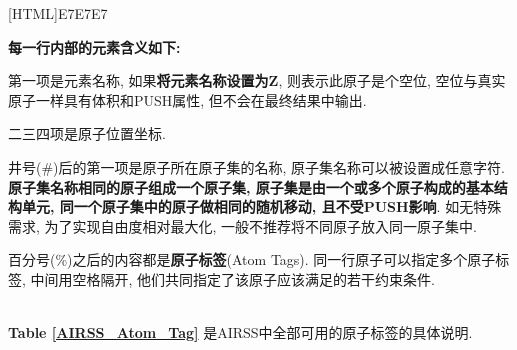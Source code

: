 \documentclass[a4paper, 10pt]{article}
\begin{document}
\noindent{}[HTML]{E7E7E7}{\parbox{\textwidth}{%
\noindent \textbf{每一行内部的元素含义如下: }
\begin{maineu}
  \item 第一项是元素名称, 如果\textbf{将元素名称设置为Z}, 则表示此原子是个空位, 空位与真实原子一样具有体积和PUSH属性, 但不会在最终结果中输出.
  \item 二三四项是原子位置坐标.
  \item 井号(\#)后的第一项是原子所在原子集的名称, 原子集名称可以被设置成任意字符. \textbf{原子集名称相同的原子组成一个原子集, 原子集是由一个或多个原子构成的基本结构单元, 同一个原子集中的原子做相同的随机移动, 且不受PUSH影响}. 如无特殊需求, 为了实现自由度相对最大化, 一般不推荐将不同原子放入同一原子集中.
  \item 百分号(\%)之后的内容都是\textbf{原子标签}(Atom Tags). 同一行原子可以指定多个原子标签, 中间用空格隔开, 他们共同指定了该原子应该满足的若干约束条件.
\end{maineu}}}\\

\textbf{Table \ref{AIRSS_Atom_Tag}} 是AIRSS中全部可用的原子标签的具体说明.
\end{document}

